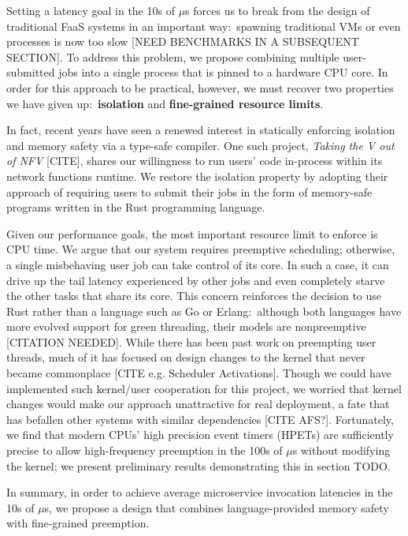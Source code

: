 Setting a latency goal in the 10s of $\mu$s forces us to break from the design of traditional FaaS systems in an important way:\ spawning traditional VMs or even processes is now too slow [NEED BENCHMARKS IN A SUBSEQUENT SECTION].
To address this problem, we propose combining multiple user-submitted jobs into a single process that is pinned to a hardware CPU core.
In order for this approach to be practical, however, we must recover two properties we have given up:\ \textbf{isolation} and \textbf{fine-grained resource limits}.

In fact, recent years have seen a renewed interest in statically enforcing isolation and memory safety via a type-safe compiler.
One such project, \textit{Taking the V out of NFV} [CITE], shares our willingness to run users' code in-process within its network functions runtime.
We restore the isolation property by adopting their approach of requiring users to submit their jobs in the form of memory-safe programs written in the Rust programming language.

Given our performance goals, the most important resource limit to enforce is CPU time.
We argue that our system requires preemptive scheduling; otherwise, a single misbehaving user job can take control of its core.
In such a case, it can drive up the tail latency experienced by other jobs and even completely starve the other tasks that share its core.
This concern reinforces the decision to use Rust rather than a language such as Go or Erlang:\ although both languages have more evolved support for green threading, their models are nonpreemptive [CITATION NEEDED].
While there has been past work on preempting user threads, much of it has focused on design changes to the kernel that never became commonplace [CITE e.g. Scheduler Activations].
Though we could have implemented such kernel/user cooperation for this project, we worried that kernel changes would make our approach unattractive for real deployment, a fate that has befallen other systems with similar dependencies [CITE AFS?].
Fortunately, we find that modern CPUs' high precision event timers (HPETs) are sufficiently precise to allow high-frequency preemption in the 100s of $\mu$s  without modifying the kernel; we present preliminary results demonstrating this in section TODO.


In summary, in order to achieve average microservice invocation latencies in the 10s of $\mu$s, we propose a design that combines language-provided memory safety with fine-grained preemption.
